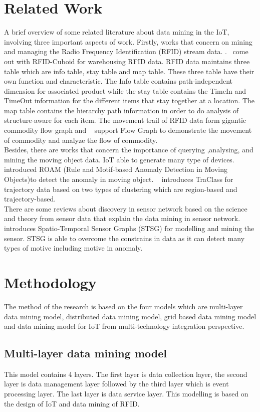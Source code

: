 \documentclass[a4paper,12pt]{article}
\begin{document}
{\section{Related Work}
A brief overview of some related literature about data mining in the IoT, involving three important aspects of work. Firstly, works that concern on mining and managing the Radio Frequency Identification (RFID) stream data. 
.~\cite{Hector4} come out with RFID-Cuboid for warehousing RFID data. RFID data maintains three table which are info table, stay table and map table. These three table have their own function and characteristic. The Info table contains path-independent dimension for associated product while the stay table contains the  TimeIn and TimeOut information for the different items that stay together at a location. The map table contains the hierarchy path information in order to do analysis of structure-aware for each item. The movement trail of RFID data form gigantic commodity flow graph and ~\cite{Hector5} support Flow Graph to demonstrate the movement of commodity and analyze the flow of commodity.\\
\indent
Besides, there are works that concern the importance of querying ,analysing, and mining the moving object data. IoT able to generate many type of devices.~\cite{Li7} introduced ROAM (Rule and Motif-based Anomaly Detection in Moving Objects)to detect the anomaly in moving object. ~\cite{Lee10} introduces TraClass for trajectory data based on two types of clustering which are region-based and trajectory-based.\\
\indent
There are some reviews about discovery in sensor network based on the science and theory from sensor data that explain the data mining in sensor network. ~\cite{Betsy13} introduces Spatio-Temporal Sensor Graphs (STSG) for modelling and mining the sensor. STSG is able to overcome the constrains in data as it can detect many types of motive including motive in anomaly.
\section{Methodology}
The method of the research is based on the four models which are multi-layer data mining model, distributed data mining model, grid based data mining model and data mining model for IoT from multi-technology integration perspective.
\subsection{Multi-layer data mining model}
This model contains 4 layers. The first layer is data collection layer, the second layer is data management layer followed by the third layer which is event processing layer. The last layer is data service layer. This modelling is based on the design of IoT and data mining of RFID.
}
\end{document}
